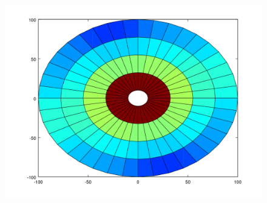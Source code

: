 \begin{figure}[H]
\begin{minipage}{0.30\textwidth}
  \centering
    \includegraphics[width=1\textwidth]{imgs/comp_rads_bueno/comp_radss_temp0.png} 
    \caption{} 
  \label{fig:Radios_3}
\end{minipage}
\end{figure}

